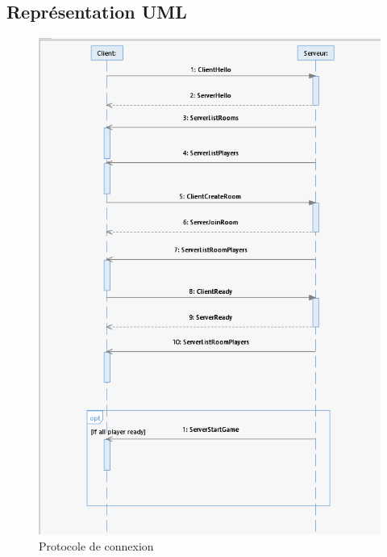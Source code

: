 \documentclass[a4paper, 12pt, twoside]{article}
\begin{document}
\subsection{Représentation UML}
\begin{figure}[H]
    \includegraphics[scale=0.6]{./Diagramme/Connection}
    \caption{Protocole de connexion}
\end{figure}
\newpage
\end{document}
